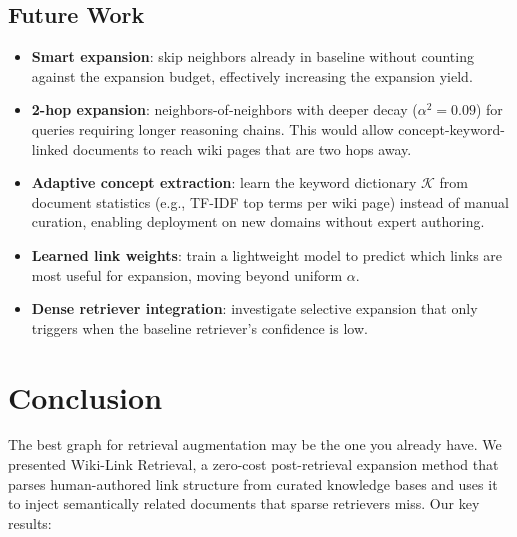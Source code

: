 \documentclass[sigconf,review]{acmart}
\newcommand{\sys}{Wiki-Link Retrieval\xspace}
\begin{document}
\subsection{Future Work}

\begin{itemize}
  \item \textbf{Smart expansion}: skip neighbors already in baseline without counting against the expansion budget, effectively increasing the expansion yield.
  \item \textbf{2-hop expansion}: neighbors-of-neighbors with deeper decay ($\alpha^2 = 0.09$) for queries requiring longer reasoning chains.  This would allow concept-keyword-linked documents to reach wiki pages that are two hops away.
  \item \textbf{Adaptive concept extraction}: learn the keyword dictionary $\mathcal{K}$ from document statistics (e.g., TF-IDF top terms per wiki page) instead of manual curation, enabling deployment on new domains without expert authoring.
  \item \textbf{Learned link weights}: train a lightweight model to predict which links are most useful for expansion, moving beyond uniform $\alpha$.
  \item \textbf{Dense retriever integration}: investigate selective expansion that only triggers when the baseline retriever's confidence is low.
\end{itemize}


\section{Conclusion}
\label{sec:conclusion}

The best graph for retrieval augmentation may be the one you already have.
We presented \sys, a zero-cost post-retrieval expansion method that
parses human-authored link structure from curated knowledge bases and
uses it to inject semantically related documents that sparse retrievers
miss.  Our key results:
\end{document}

